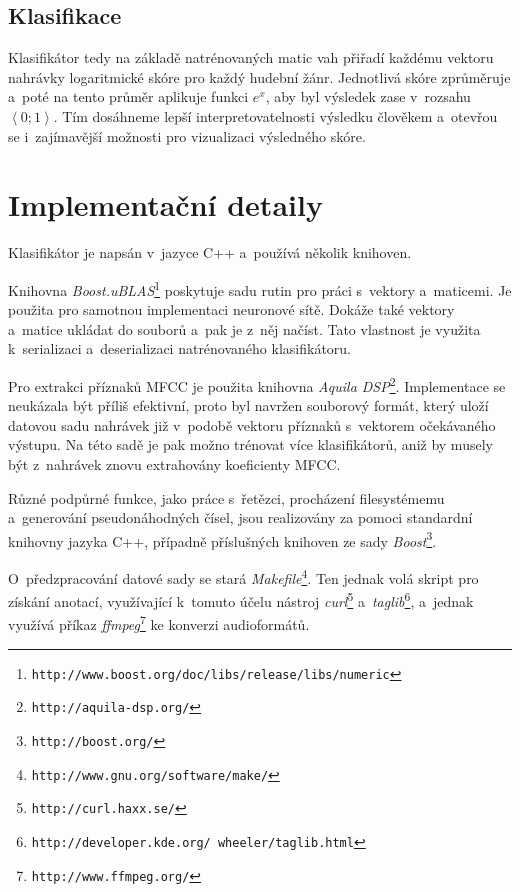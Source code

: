 \documentclass[10pt,a4paper,twocolumn]{article}
\begin{document}
\subsection{Klasifikace}

Klasifikátor tedy na základě natrénovaných matic vah přiřadí každému vektoru nahrávky logaritmické skóre pro každý
hudební žánr. Jednotlivá skóre zprůměruje a~poté na tento průměr aplikuje funkci $e^x$,
aby byl výsledek zase v~rozsahu $\left<0; 1\right>$.
Tím dosáhneme lepší interpretovatelnosti výsledku člověkem a~otevřou se i~zajímavější možnosti pro vizualizaci
výsledného skóre.

\section{Implementační detaily}
\label{impl}

Klasifikátor je napsán v~jazyce C++ a~používá několik knihoven.

Knihovna \emph{Boost.uBLAS}\footnote{\texttt{http://www.boost.org/doc/libs/release/libs/numeric}}
poskytuje sadu rutin pro práci s~vektory a~maticemi.
Je použita pro samotnou implementaci neuronové sítě.
Dokáže také vektory a~matice ukládat do souborů a~pak je z~něj načíst.
Tato vlastnost je využita k~serializaci a~deserializaci natrénovaného klasifikátoru.

Pro extrakci příznaků MFCC je použita knihovna \emph{Aquila DSP}\footnote{\texttt{http://aquila-dsp.org/}}.
Implementace se neukázala být příliš efektivní, proto byl navržen souborový formát,
který uloží datovou sadu nahrávek již v~podobě vektoru příznaků s~vektorem očekávaného výstupu.
Na této sadě je pak možno trénovat více klasifikátorů, aniž by musely být z~nahrávek
znovu extrahovány koeficienty MFCC.

Různé podpůrné funkce, jako práce s~řetězci, procházení filesystémemu a~generování pseudonáhodných čísel, jsou realizovány
za pomoci standardní knihovny jazyka C++, případně příslušných knihoven ze sady \emph{Boost}\footnote{\texttt{http://boost.org/}}.

O~předzpracování datové sady se stará \emph{Makefile}\footnote{\texttt{http://www.gnu.org/software/make/}}.
Ten jednak volá skript pro získání anotací, využívající k~tomuto účelu nástroj \emph{curl}\footnote{\texttt{http://curl.haxx.se/}}
a~\emph{taglib}\footnote{\texttt{http://developer.kde.org/~wheeler/taglib.html}},
a~jednak využívá příkaz \emph{ffmpeg}\footnote{\texttt{http://www.ffmpeg.org/}} ke konverzi audioformátů.
\end{document}
